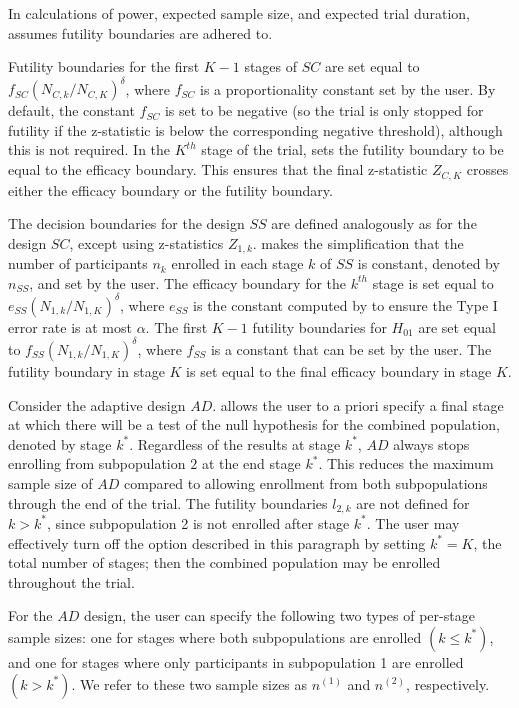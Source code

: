 \documentclass[article]{jss}
\begin{document}
In calculations of power, expected sample size, and expected trial duration,  assumes futility boundaries are adhered to. 

Futility boundaries for the first $K-1$ stages of $SC$ are set equal to $f_{SC}(N_{C,k}/N_{C,K})^{\delta}$, where $f_{SC}$ is a proportionality constant set by the user. By default, the constant $f_{SC}$ is set to be negative (so the trial  is only stopped for futility  if the z-statistic is below the corresponding negative threshold), although this is not required. In the $K ^{th}$ stage of the trial,  sets the futility boundary to be equal to the efficacy boundary. This ensures that the final z-statistic $Z_{C,K}$ crosses either the efficacy boundary or the futility boundary.

The decision boundaries for the design $SS$  are defined analogously as for the design $SC$, except using z-statistics $Z_{1,k}$.  makes the simplification that the number of participants $n_k$ enrolled in each stage $k$ of $SS$ is constant, denoted by $n_{SS}$, and set by the user.
The efficacy boundary for the $k^{th}$ stage is set equal to $e_{SS}(N_{1,k}/N_{1,K})^{\delta}$, where $e_{SS}$ is the constant computed by    to ensure  the  Type I error rate is at most $\alpha$. The first $K-1$ futility boundaries for $H_{01}$ are set equal to $f_{SS}(N_{1,k}/N_{1,K})^{\delta}$,  where $f_{SS}$ is a constant that can be set by the user. The futility boundary in stage $K$ is set equal to the final efficacy boundary in stage $K$.

Consider the adaptive design $AD$.
 allows the user to a priori specify a final stage  at which there will be a test of  the null hypothesis for the combined population, denoted by stage $k^*$. Regardless of the results at stage $k^*$, $AD$ always stops enrolling from subpopulation $2$ at the end stage $k^*$. This reduces the maximum sample size of $AD$ compared to allowing enrollment from both subpopulations through the end of the trial.
The futility boundaries $l_{2,k}$ are not defined for $k>k^*$, since subpopulation 2 is not enrolled after stage $k^*$. 
The user may effectively turn off the option described in this paragraph by setting $k^*=K$, the total number of stages; then the combined population may be enrolled throughout the trial.

For the $AD$ design, the user can specify the following two types of per-stage sample sizes: one for stages where both subpopulations are enrolled $(k \leq k^*)$, and one for stages where only participants in subpopulation 1 are enrolled $(k > k^*)$. We refer to these two sample sizes as $n^{(1)}$ and $n^{(2)}$, respectively.
\end{document}
